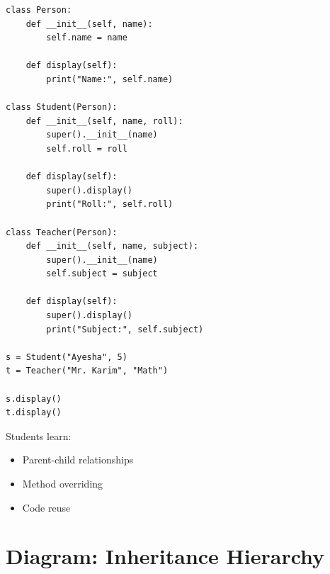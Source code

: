 \begin{verbatim}
class Person:
    def __init__(self, name):
        self.name = name

    def display(self):
        print("Name:", self.name)

class Student(Person):
    def __init__(self, name, roll):
        super().__init__(name)
        self.roll = roll

    def display(self):
        super().display()
        print("Roll:", self.roll)

class Teacher(Person):
    def __init__(self, name, subject):
        super().__init__(name)
        self.subject = subject

    def display(self):
        super().display()
        print("Subject:", self.subject)

s = Student("Ayesha", 5)
t = Teacher("Mr. Karim", "Math")

s.display()
t.display()
\end{verbatim}

Students learn:
\begin{itemize}
    \item Parent-child relationships
    \item Method overriding
    \item Code reuse
\end{itemize}

\section{Diagram: Inheritance Hierarchy}

\begin{center}
\end{center}

